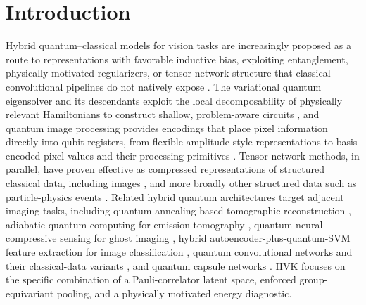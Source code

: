 \documentclass[sn-mathphys,Numbered]{sn-jnl}
\begin{document}

\maketitle

\section{Introduction}
Hybrid quantum--classical models for vision tasks are increasingly proposed as a route to representations with favorable inductive bias, exploiting entanglement, physically motivated regularizers, or tensor-network structure that classical convolutional pipelines do not natively expose \cite{Cerezo2021, Tilly2022, Preskill2018}. The variational quantum eigensolver and its descendants exploit the local decomposability of physically relevant Hamiltonians to construct shallow, problem-aware circuits \cite{Cerezo2021, Tilly2022, Bauer2020}, and quantum image processing provides encodings that place pixel information directly into qubit registers, from flexible amplitude-style representations \cite{Le2011} to basis-encoded pixel values \cite{Zhang2013} and their processing primitives \cite{Chakraborty2018, Zhou2017, Yao2017}. Tensor-network methods, in parallel, have proven effective as compressed representations of structured classical data, including images \cite{Cirac2021, Latorre2005, Han2018, Stoudenmire2016, Fei2021, Guala2023}, and more broadly other structured data such as particle-physics events \cite{Araz2022}. Related hybrid quantum architectures target adjacent imaging tasks, including quantum annealing-based tomographic reconstruction \cite{Haga2024}, adiabatic quantum computing for emission tomography \cite{Nau2023}, quantum neural compressive sensing for ghost imaging \cite{Zhai2025}, hybrid autoencoder-plus-quantum-SVM feature extraction for image classification \cite{Slabbert2024}, quantum convolutional networks and their classical-data variants \cite{Cong2019, Hur2022}, and quantum capsule networks \cite{Liu2022}. HVK focuses on the specific combination of a Pauli-correlator latent space, enforced group-equivariant pooling, and a physically motivated energy diagnostic.
\end{document}
